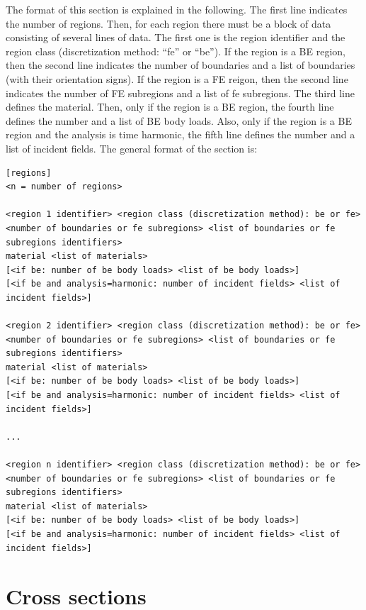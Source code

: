 \documentclass[a4paper,fleqn]{book}
\begin{document}
The format of this section is explained in the following. The first line indicates the number of regions. Then, for each region there must be a block of data consisting of several lines of data. The first one is the region identifier and the region class (discretization method: ``fe'' or ``be''). If the region is a BE region, then the second line indicates the number of boundaries and a list of boundaries (with their orientation signs). If the region is a FE reigon, then the second line indicates the number of FE subregions and a list of fe subregions. The third line defines the material. Then, only if the region is a BE region, the fourth line defines the number and a list of BE body loads. Also, only if the region is a BE region and the analysis is time harmonic, the fifth line defines the number and a list of incident fields. The general format of the section is:
\begin{Verbatim}[frame=single, fontsize=\small, label={general format of section [regions]}]
[regions]
<n = number of regions>

<region 1 identifier> <region class (discretization method): be or fe> 
<number of boundaries or fe subregions> <list of boundaries or fe subregions identifiers>
material <list of materials>
[<if be: number of be body loads> <list of be body loads>]
[<if be and analysis=harmonic: number of incident fields> <list of incident fields>]

<region 2 identifier> <region class (discretization method): be or fe> 
<number of boundaries or fe subregions> <list of boundaries or fe subregions identifiers>
material <list of materials>
[<if be: number of be body loads> <list of be body loads>]
[<if be and analysis=harmonic: number of incident fields> <list of incident fields>]

...

<region n identifier> <region class (discretization method): be or fe> 
<number of boundaries or fe subregions> <list of boundaries or fe subregions identifiers>
material <list of materials>
[<if be: number of be body loads> <list of be body loads>]
[<if be and analysis=harmonic: number of incident fields> <list of incident fields>]
\end{Verbatim} 





\section{Cross sections}
\end{document}
